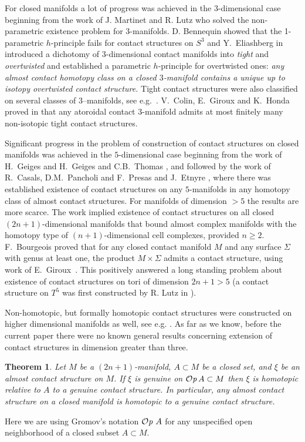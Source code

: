 \documentclass[12pt]{paper}
\theoremstyle{plain}
\newtheorem{theorem}{Theorem}[section]
\theoremstyle{definition}
\def\Op{{\mathcal O}{\it p}\,}
\numberwithin{figure}{section}
\begin{document}
For closed manifolds a  lot of progress  was achieved in the $3$-dimensional case beginning from the work of J. Martinet \cite{Martinet} and  R. Lutz \cite{Lutz} who  solved the non-parametric existence  problem for $3$-manifolds. 
D. Bennequin \cite{Bennequin} showed that the 1-parametric $h$-principle fails for contact structures on $S^3$ and    Y.~Eliashberg  in \cite{Eli89} introduced a dichotomy of $3$-dimensional contact manifolds into {\it tight} and  {\it overtwisted} 
and established a parametric $h$-principle for overtwisted ones:
{\em any almost contact homotopy class on a closed $3$-manifold contains a unique up to isotopy overtwisted contact structure.} Tight contact structures were also classified on several classes of 3--manifolds, see e.g.\ \cite{Eli92,Gi00, Ho00,Ho00-2}. V.~Colin, E.~Giroux and K.~Honda proved in   \cite{CoGiHo}  that  any atoroidal contact 3-manifold admits at most finitely many non-isotopic tight contact structures.


Significant progress in the problem of construction of contact structures on closed manifolds was achieved in the $5$-dimensional  case beginning from the work of H.~Geiges \cite{Ge91, Ge97} and H.~Geiges and  C.B.~Thomas  \cite{GeTh98, GeTh01},  and followed by the work of 
R.~Casals, D.M.~Pancholi and F.~Presas \cite{CaPaPr13} and J.~Etnyre \cite{Etn13}, where there was established existence of  contact structures on any $5$-manifolds  in any homotopy class of almost contact structures.
For manifolds of dimension $>5$ the results are more scarce.
The work \cite{Eli90} implied existence of contact structures on all closed
$(2n+1)$-dimensional manifolds that bound almost complex manifolds with the homotopy type of $(n+1)$-dimensional cell complexes, provided $n \geq 2$.
F.~Bourgeois \cite{Bourg02} proved that for any closed contact manifold $M$ and any surface $\Sigma$ with genus at least one, the product $M\times\Sigma$ admits a contact structure, using work of E.~Giroux~\cite{Gir02G}.
This positively answered a long standing problem about existence of contact structures on tori of dimension $2n+1>5$ (a contact structure on $T^5$ was first constructed by R. Lutz in \cite{Lutz-torus}).

Non-homotopic, but  formally homotopic contact structures were constructed   on higher dimensional manifolds as well, see e.g. \cite{Ust}. As far as we know,  before the current paper  there were no known  general results concerning extension of contact structures in dimension greater than three.  

    \begin{theorem}\label{thm:main-existence} Let $M$ be a $(2n+1)$-manifold, $A\subset M$ be a closed set, and
     $\xi$ be an almost contact structure on $M$.
    If $\xi$ is genuine on $\Op A\subset M$ then $\xi$ is homotopic relative to $A$ to a genuine contact structure.
    In particular, any almost contact structure on a closed manifold is homotopic to a genuine contact structure.
    \end{theorem}
    Here we are using Gromov's notation $\Op\,A$  for any unspecified open neighborhood of a closed subset $A\subset M$.
    
\end{document}
